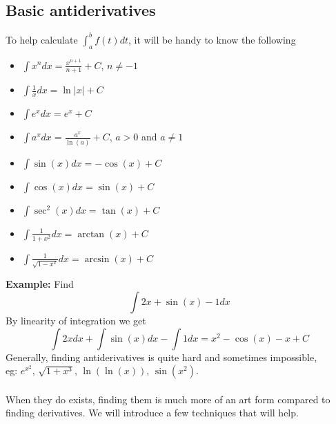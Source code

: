 \documentclass[11pt, a4paper]{memoir}
\theoremstyle{change}
\theoremstyle{plain}
\theoremstyle{nonumberplain}
\numberwithin{equation}{section}
\begin{document}
\subsection{Basic antiderivatives}
To help calculate $\int^b_a f(t) dt$, it will be handy to know the following 
\begin{itemize}
  \item $\int x^n dx = \frac{x^{n+1}}{n+1} + C$, \hspace{3ex} $n \ne -1$
  \item $\int \frac{1}{x} dx = \ln |x| + C$
  \item $\int e^x dx = e^x + C$
  \item $\int a^x dx = \frac{a^x}{\ln(a)} + C$, \hspace{3ex} $a > 0$ and $a \ne 1$
  \item $\int \sin(x) dx = -\cos(x) + C$
  \item $\int \cos(x) dx = \sin(x) + C$
  \item $\int \sec^2(x) dx = \tan(x) + C$
  \item $\int \frac{1}{1+x^2} dx = \arctan(x) + C$
  \item $\int \frac{1}{\sqrt{1-x^2}} dx = \arcsin(x) + C$
\end{itemize}
\vspace{1.5ex}
\textbf{Example: } Find $$\int 2x + \sin(x) - 1 dx$$
By linearity of integration we get $$\int 2x dx + \int \sin(x) dx - \int 1 dx = x^2 - \cos(x) - x + C$$
Generally, finding antiderivatives is quite hard and sometimes impossible,\\
eg: $e^{x^2}$, $\sqrt{1 + x^3}$, $\ln(\ln(x))$, $\sin(x^2)$.\\ \vspace{0.5ex} \\
When they do exists, finding them is much more of an art form compared to finding derivatives. We will introduce a few
techniques that will help.
\end{document}

